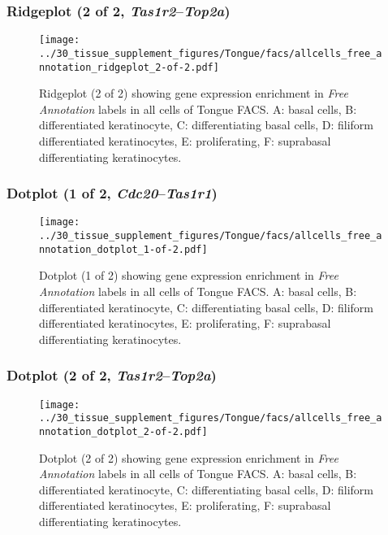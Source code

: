 \clearpage

\subsubsection{Ridgeplot (2 of 2, \emph{Tas1r2}--\emph{Top2a})}
\begin{figure}[h]
\centering
\texttt{[image: ../30\_tissue\_supplement\_figures/Tongue/facs/allcells\_free\_annotation\_ridgeplot\_2-of-2.pdf]}

\caption{ Ridgeplot (2 of 2)  showing gene expression enrichment in \emph{Free Annotation} labels in all cells of Tongue FACS. A: basal cells, B: differentiated keratinocyte, C: differentiating basal cells, D: filiform differentiated keratinocytes, E: proliferating, F: suprabasal differentiating keratinocytes.}
\end{figure}


\clearpage

\subsubsection{Dotplot (1 of 2, \emph{Cdc20}--\emph{Tas1r1})}
\begin{figure}[h]
\centering
\texttt{[image: ../30\_tissue\_supplement\_figures/Tongue/facs/allcells\_free\_annotation\_dotplot\_1-of-2.pdf]}

\caption{ Dotplot (1 of 2)  showing gene expression enrichment in \emph{Free Annotation} labels in all cells of Tongue FACS. A: basal cells, B: differentiated keratinocyte, C: differentiating basal cells, D: filiform differentiated keratinocytes, E: proliferating, F: suprabasal differentiating keratinocytes.}
\end{figure}


\clearpage

\subsubsection{Dotplot (2 of 2, \emph{Tas1r2}--\emph{Top2a})}
\begin{figure}[h]
\centering
\texttt{[image: ../30\_tissue\_supplement\_figures/Tongue/facs/allcells\_free\_annotation\_dotplot\_2-of-2.pdf]}

\caption{ Dotplot (2 of 2)  showing gene expression enrichment in \emph{Free Annotation} labels in all cells of Tongue FACS. A: basal cells, B: differentiated keratinocyte, C: differentiating basal cells, D: filiform differentiated keratinocytes, E: proliferating, F: suprabasal differentiating keratinocytes.}
\end{figure}

